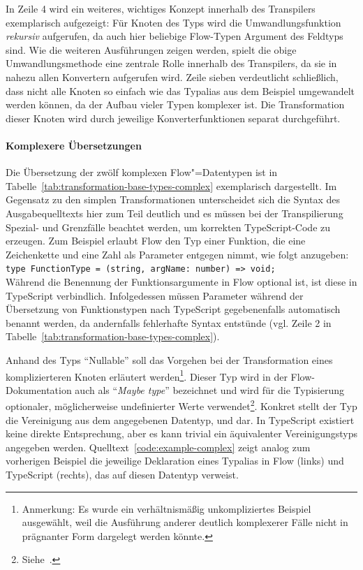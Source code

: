 {In Zeile 4 wird ein weiteres, wichtiges Konzept innerhalb des Transpilers exemplarisch aufgezeigt: Für Knoten des Typs  wird die Umwandlungsfunktion \emph{rekursiv} aufgerufen, da auch hier beliebige Flow-Typen Argument des Feldtyps sind. Wie die weiteren Ausführungen zeigen werden, spielt die obige Umwandlungsmethode eine zentrale Rolle innerhalb des Transpilers, da sie in nahezu allen Konvertern aufgerufen wird. Zeile sieben verdeutlicht schließlich, dass nicht alle Knoten so einfach wie das Typalias aus dem Beispiel umgewandelt werden können, da der Aufbau vieler Typen komplexer ist. Die Transformation dieser Knoten wird durch jeweilige Konverterfunktionen separat durchgeführt.

\paragraph{Komplexere Übersetzungen}

Die Übersetzung der zwölf komplexen Flow"=Datentypen ist in Tabelle~\ref{tab:transformation-base-types-complex} exemplarisch dargestellt. Im Gegensatz zu den simplen Transformationen unterscheidet sich die Syntax des Ausgabequelltexts hier zum Teil deutlich und es müssen bei der Transpilierung Spezial- und Grenzfälle beachtet werden, um korrekten TypeScript-Code zu erzeugen. Zum Beispiel erlaubt Flow den Typ einer Funktion, die eine Zeichenkette und eine Zahl als Parameter entgegen nimmt, wie folgt anzugeben:
\\[.5\baselineskip]
{\small\texttt{type FunctionType = (string, argName: number) => void;}}
\\[.5\baselineskip]
Während die Benennung der Funktionsargumente in Flow optional ist, ist diese in TypeScript verbindlich. Infolgedessen müssen Parameter während der Übersetzung von Funktionstypen nach TypeScript gegebenenfalls automatisch benannt werden, da andernfalls fehlerhafte Syntax entstünde (vgl. Zeile 2 in Tabelle~\ref{tab:transformation-base-types-complex}).

\bigbreak


Anhand des Typs \enquote{Nullable} soll das Vorgehen bei der Transformation eines komplizierteren Knoten erläutert werden\footnote{Anmerkung: Es wurde ein verhältnismäßig unkompliziertes Beispiel ausgewählt, weil die Ausführung anderer deutlich komplexerer Fälle nicht in prägnanter Form dargelegt werden könnte.}. Dieser Typ wird in der Flow-Dokumentation auch als \enquote{\textit{Maybe type}} bezeichnet und wird für die Typisierung optionaler, möglicherweise undefinierter Werte verwendet\footnote{Siehe~\autocite[Maybe Types]{FLOW:TYPE_ANNOTATIONS}.}. Konkret stellt der Typ die Vereinigung aus dem angegebenen Datentyp,  und  dar. In TypeScript existiert keine direkte Entsprechung, aber es kann trivial ein äquivalenter Vereinigungstyps angegeben werden. Quelltext~\ref{code:example-complex} zeigt analog zum vorherigen Beispiel die jeweilige Deklaration eines Typalias in Flow (links) und TypeScript (rechts), das auf diesen Datentyp verweist.

}
